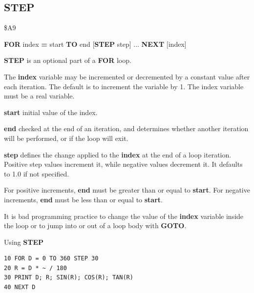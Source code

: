 \subsection{STEP}
\begin{description}[leftmargin=2cm,style=nextline]
\item [Token:]    \$A9

\item [Format:]   {\bf FOR} index {\bf =} start {\bf TO} end [{\bf STEP} step] ... {\bf NEXT} [index]

\item [Usage:]    {\bf STEP} is an optional part of a {\bf FOR} loop.

                  The {\bf index} variable may be incremented or decremented by a constant value after each iteration. The default is to increment the variable by 1. The index variable must be a real variable.

                  {\bf start} initial value of the index.

                  {\bf end} checked at the end of an iteration, and determines whether another iteration will be performed, or if the loop will exit.

                  {\bf step} defines the change applied to the {\bf index} at the end of a loop iteration. Positive step values increment it, while negative values decrement it. It defaults to 1.0 if not specified.

\item [Remarks:]  For positive increments, {\bf end} must be greater than or equal to {\bf start}. For negative increments, {\bf end} must be less than or equal to {\bf start}.

                  It is bad programming practice to change the value of the {\bf index} variable inside the loop or to jump into or out of a loop body with {\bf GOTO}.

\item [Example:]  Using {\bf STEP}

\begin{tcolorbox}[colback=black,coltext=white]
\verbatimfont{\codefont}
\begin{verbatim}
10 FOR D = 0 TO 360 STEP 30
20 R = D * ~ / 180
30 PRINT D; R; SIN(R); COS(R); TAN(R)
40 NEXT D
\end{verbatim}
\end{tcolorbox}
\end{description}



